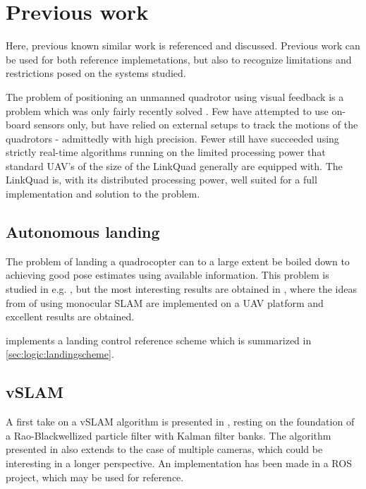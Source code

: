 \section{Previous work}
\label{sec:previouswork}
    Here, previous known similar work is referenced and discussed.
    Previous work can be used for both reference implemetations, but also to
    recognize limitations and restrictions posed on the systems studied.

    The problem of positioning an unmanned quadrotor using
    visual feedback is a problem which was only fairly recently solved
    \citep{DBLP:conf/icra/BloschWSS10,weiss11monocular}.
    Few have attempted to use on-board sensors only, but have relied on
    external setups to track the motions of the quadrotors - admittedly with high precision.
    Fewer still have succeeded using strictly real-time algorithms
    running on the limited processing power that standard
    UAV's of the size of the LinkQuad generally are equipped with.
    The LinkQuad is, with its distributed processing power, well suited
    for a full implementation and solution to the problem.

    \subsection{Autonomous landing}
    The problem of landing a quadrocopter can to a large extent be boiled
    down to achieving good pose estimates using available information.
    This problem is studied in e.g. \citep{DM:MS:10,brockers:803111},
    but the most interesting results are obtained in \citep{DBLP:conf/icra/BloschWSS10,weiss11monocular},
    where the ideas from \citep{klein07parallel} of using monocular SLAM
    are implemented on a UAV platform and excellent results are obtained.

    \citep{brockers:803111} implements a landing control reference scheme
    which is summarized in \ref{sec:logic:landingscheme}.

    \subsection{vSLAM}
    A first take on a vSLAM algorithm is presented in \citep{Karlsson05thevslam}, resting on the
    foundation of a Rao-Blackwellized particle filter with Kalman filter banks.
    The algorithm presented in \citep{Karlsson05thevslam} also extends to
    the case of multiple cameras, which could be interesting in a longer perspective.
    An implementation has been made in a ROS project\citep{rosvslam}, which may be used for
    reference.

